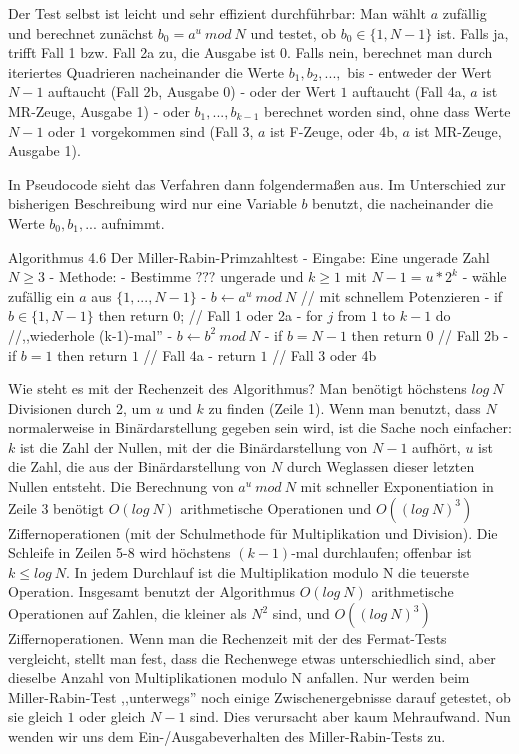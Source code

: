 \documentclass[a4paper]{article}
\begin{document}
\begin{multicols}{3}
        Der Test selbst ist leicht und sehr effizient durchführbar: Man wählt $a$ zufällig und berechnet zunächst $b_0=a^u\ mod\ N$ und testet, ob $b_0\in\{1,N-1\}$ ist. Falls ja, trifft Fall 1 bzw. Fall 2a zu, die Ausgabe ist $0$. Falls nein, berechnet man durch iteriertes Quadrieren nacheinander die Werte $b_1,b_2,...,$ bis
        - entweder der Wert $N-1$ auftaucht (Fall 2b, Ausgabe 0)
        - oder der Wert $1$ auftaucht (Fall 4a, $a$ ist MR-Zeuge, Ausgabe 1)
        - oder $b_1,...,b_{k-1}$ berechnet worden sind, ohne dass Werte $N-1$ oder $1$ vorgekommen sind (Fall 3, $a$ ist F-Zeuge, oder 4b, $a$ ist MR-Zeuge, Ausgabe 1).

        In Pseudocode sieht das Verfahren dann folgendermaßen aus. Im Unterschied zur bisherigen Beschreibung wird nur eine Variable $b$ benutzt, die nacheinander die Werte $b_0,b_1,...$ aufnimmt.

        Algorithmus 4.6 Der Miller-Rabin-Primzahltest
        - Eingabe: Eine ungerade Zahl $N\geq 3$
        - Methode:
        - Bestimme $???$ ungerade und $k\geq 1$ mit $N-1 =u*2^k$
        - wähle zufällig ein $a$ aus $\{1 ,...,N-1\}$
        - $b \leftarrow a^u\ mod\ N$ // mit schnellem Potenzieren
        - if $b\in\{1,N-1\}$ then return $0$; // Fall 1 oder 2a
        - for $j$ from $1$ to $k-1$ do //,,wiederhole (k-1)-mal''
        - $b\leftarrow b^2\ mod\ N$
        - if $b=N-1$ then return $0$ // Fall 2b
        - if $b=1$ then return $1$ // Fall 4a
        - return $1$ // Fall 3 oder 4b

        Wie steht es mit der Rechenzeit des Algorithmus? Man benötigt höchstens $log\ N$ Divisionen durch 2, um $u$ und $k$ zu finden (Zeile 1). Wenn man benutzt, dass $N$ normalerweise in Binärdarstellung gegeben sein wird, ist die Sache noch einfacher: $k$ ist die Zahl der Nullen, mit der die Binärdarstellung von $N-1$ aufhört, $u$ ist die Zahl, die aus der Binärdarstellung von $N$ durch Weglassen dieser letzten Nullen entsteht. Die Berechnung von $a^u\ mod\ N$ mit schneller Exponentiation in Zeile 3 benötigt $O(log\ N)$ arithmetische Operationen und $O((log\ N)^3)$ Ziffernoperationen (mit der Schulmethode für Multiplikation und Division). Die Schleife in Zeilen 5-8 wird höchstens $(k-1)$-mal durchlaufen; offenbar ist $k\leq log\ N$. In jedem Durchlauf ist die Multiplikation modulo N die teuerste Operation. Insgesamt benutzt der Algorithmus $O(log\ N)$ arithmetische Operationen auf Zahlen, die kleiner als $N^2$ sind, und $O((log\ N)^3)$ Ziffernoperationen. Wenn man die Rechenzeit mit der des Fermat-Tests vergleicht, stellt man fest, dass die Rechenwege etwas unterschiedlich sind, aber dieselbe Anzahl von Multiplikationen modulo N anfallen. Nur werden beim Miller-Rabin-Test ,,unterwegs'' noch einige Zwischenergebnisse darauf getestet, ob sie gleich $1$ oder gleich $N-1$ sind. Dies verursacht aber kaum Mehraufwand.
        Nun wenden wir uns dem Ein-/Ausgabeverhalten des Miller-Rabin-Tests zu.


\end{multicols}
\end{document}
